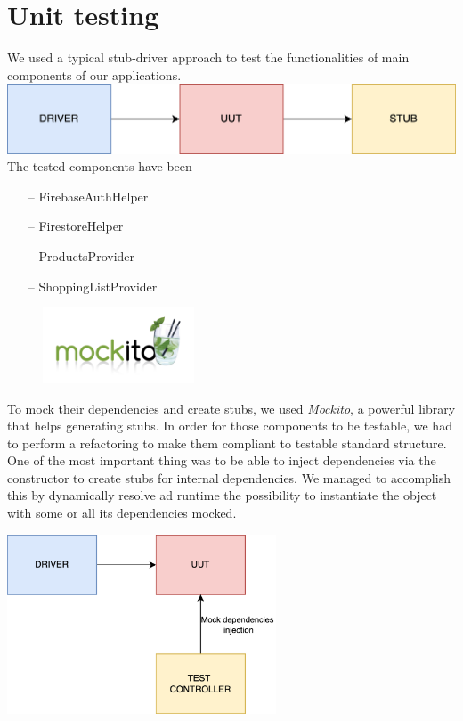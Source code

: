 \section{Unit testing}
We used a typical stub-driver approach to test the functionalities of main components of our applications. 
\newline
\newline
\hspace*{-1cm}\includegraphics[width=14cm,keepaspectratio]{Images/testing/stub_driver.png}
\newpage
\noindent The tested components have been
\begin{itemize}
    \item[--] FirebaseAuthHelper
    \item[--] FirestoreHelper
    \item[--] ProductsProvider
    \item[--] ShoppingListProvider
\end{itemize}

\begin{figure}
  \begin{center}
    \vspace*{-1cm}\includegraphics[width=0.4\textwidth]{Images/testing/logo.png}
  \end{center}
\end{figure}
To mock their dependencies and create stubs, we used \textit{Mockito}, a powerful library that helps generating stubs.
In order for those components to be testable, we had to perform a refactoring to make them compliant to testable standard structure. One of the most important thing was to be able to inject dependencies via the constructor to create stubs for internal dependencies. We managed to accomplish this by dynamically resolve ad runtime the possibility to instantiate the object with some or all its dependencies mocked.
\newline
\newline
\begin{center}
    \includegraphics[width=8cm,keepaspectratio]{Images/testing/stub_driver_injection.png}
\end{center}

